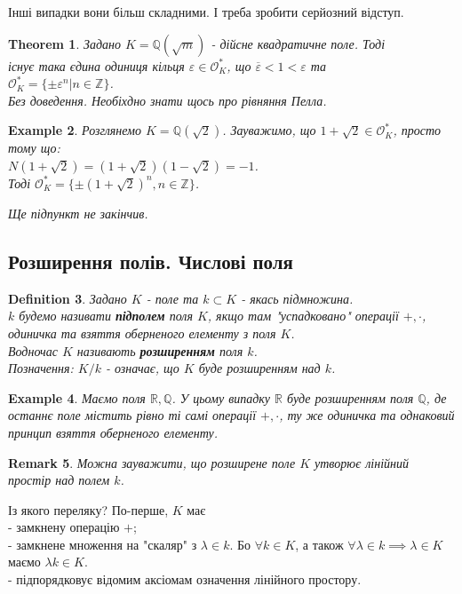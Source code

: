 \documentclass[a4paper, 10pt]{article}
\theoremstyle{theoremdd}
\newtheorem{theorem}{Theorem}[subsection]
\theoremstyle{theoremdd}
\newtheorem{definition}[theorem]{Definition}
\theoremstyle{theoremdd}
\theoremstyle{theoremdd}
\newtheorem{example}[theorem]{Example}
\theoremstyle{theoremdd}
\theoremstyle{theoremdd}
\newtheorem{remark}[theorem]{Remark}
\theoremstyle{theoremdd}
\theoremstyle{theoremdd}
\begin{document}
Інші випадки вони більш складними. І треба зробити серйозний відступ.

\begin{theorem}
Задано $K = \mathbb{Q}(\sqrt{m})$ - дійсне квадратичне поле. Тоді\\
існує така єдина одиниця кільця $\varepsilon \in \mathcal{O}^*_K$, що $\overline{\varepsilon} < 1 < \varepsilon$ та \\
$\mathcal{O}^*_K = \{ \pm \varepsilon^n | n \in \mathbb{Z} \}$.\\
\textit{Без доведення. Необіхдно знати щось про рівняння Пелла.}
\end{theorem}

\begin{example}
Розглянемо $K = \mathbb{Q}(\sqrt{2})$. Зауважимо, що $1+\sqrt{2} \in \mathcal{O}^*_K$, просто тому що:\\
$N(1+\sqrt{2}) = (1+\sqrt{2})(1-\sqrt{2}) = -1$.\\
Тоді $\mathcal{O}^*_K = \{ \pm (1+\sqrt{2})^n, n \in \mathbb{Z} \}$.
\end{example}

\textit{Ще підпункт не закінчив.}

\subsection{Розширення полів. Числові поля}
\begin{definition}
Задано $K$ - поле та $k \subset K$ - якась підмножина.\\
$k$ будемо називати \textbf{підполем} поля $K$, якщо там "успадковано" операції $+,\cdot$, одиничка та взяття оберненого елементу з поля $K$.\\
Водночас $K$ називають \textbf{розширенням} поля $k$.\\
Позначення: $K/k$ - означає, що $K$ буде розширенням над $k$.
\end{definition}

\begin{example}
Маємо поля $\mathbb{R}, \mathbb{Q}$. У цьому випадку $\mathbb{R}$ буде розширенням поля $\mathbb{Q}$, де останнє поле містить рівно ті самі операції $+,\cdot$, ту же одиничка та однаковий принцип взяття оберненого елементу.
\end{example}

\begin{remark}
Можна зауважити, що розширене поле $K$ утворює лінійний простір над полем $k$.
\end{remark}
Із якого переляку? По-перше, $K$ має\\
- замкнену операцію $+$;\\
- замкнене множення на "скаляр" з $\lambda \in k$. Бо $\forall k \in K$, а також $\forall \lambda \in k \implies \lambda \in K$ маємо $\lambda k \in K$.\\
- підпорядковує відомим аксіомам означення лінійного простору.
\end{document}
